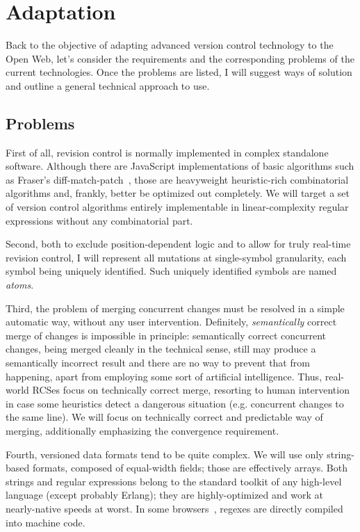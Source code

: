 \documentclass{acm_proc_article-sp}
\begin{document}
\section {Adaptation}   \label{sec:textile}

Back to the objective of adapting advanced version control technology to the Open Web, let's consider the requirements and the corresponding problems of the current technologies. 
Once the problems are listed, I will suggest ways of solution and outline a general technical approach to use.

\subsection {Problems}
First of all, revision control is normally implemented
in complex standalone software. Although there are JavaScript
implementations of basic algorithms such as Fraser's
diff-match-patch~\cite{diff-match-patch}, those are
heavyweight heuristic-rich combinatorial
algorithms and, frankly, better be optimized out
completely. We will target a set of version control
algorithms entirely implementable in 
linear-complexity regular
expressions without any combinatorial part.

Second, both to exclude position-dependent logic and to allow for truly real-time revision control, I will represent all mutations at single-symbol granularity, each symbol being uniquely identified.
Such uniquely identified symbols are named \emph{atoms}.

Third, the problem of merging concurrent changes must
be resolved in a simple automatic way, without any user
intervention. Definitely,
\emph{semantically} correct merge of changes is impossible
in principle: semantically correct concurrent
changes, being merged cleanly in
the technical sense, still may produce a semantically
incorrect result and there are no way to prevent that
from happening,
apart from employing some sort of artificial
intelligence. Thus, real-world RCSes focus on technically
correct merge, resorting to human intervention in case
some heuristics detect a dangerous situation (e.g.
concurrent changes to the same line).
We will focus on technically correct and predictable way
of merging, additionally emphasizing the convergence
requirement.

Fourth, versioned data formats tend to be quite complex.
We will use only string-based formats, composed of equal-width fields; those are effectively arrays.
Both strings and regular expressions belong to the standard toolkit of any high-level language (except probably Erlang); they are highly-optimized and work at nearly-native speeds at worst.
In some browsers~\cite{wrec}, regexes are directly compiled into machine code.
\end{document}
